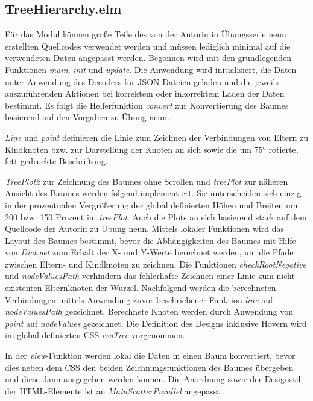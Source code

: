 \documentclass[usegeometry=true]{scrartcl}
\begin{document}
\subsection{TreeHierarchy.elm}
Für das Modul können große Teile des von der Autorin in Übungsserie neun erstellten Quellcodes verwendet werden und müssen lediglich minimal auf die verwendeten Daten angepasst werden. 
Begonnen wird mit den grundlegenden Funktionen \textit{main}, \textit{init} und \textit{update}. 
Die Anwendung wird initialisiert, die Daten unter Anwendung des Decoders für JSON-Dateien geladen und die jeweils auszuführenden Aktionen bei korrektem oder inkorrektem Laden der Daten bestimmt. 
Es folgt die Helferfunktion \textit{convert} zur Konvertierung des Baumes basierend auf den Vorgaben zu Übung neun.

\textit{Line} und \textit{point} definieren die Linie zum Zeichnen der Verbindungen von Eltern zu Kindknoten bzw. zur Darstellung der Knoten an sich sowie die um 75° rotierte, fett gedruckte Beschriftung. 

\textit{TreePlot2} zur Zeichnung des Baumes ohne Scrollen und \textit{treePlot} zur näheren Ansicht des Baumes werden folgend implementiert. 
Sie unterscheiden sich einzig in der prozentualen Vergrößerung der global definierten Höhen und Breiten um 200 bzw. 150 Prozent im \textit{treePlot}.
Auch die Plots an sich basierend stark auf dem Quellcode der Autorin zu Übung neun. 
Mittels lokaler Funktionen wird das Layout des Baumes bestimmt, bevor die Abhängigkeiten des Baumes mit Hilfe von \textit{Dict.get} zum Erhalt der X- und Y-Werte berechnet werden, um die Pfade zwischen Eltern- und Kindknoten zu zeichnen. 
Die Funktionen \textit{checkRootNegative} und \textit{nodeValuesPath} verhindern das fehlerhafte Zeichnen einer Linie zum nicht existenten Elternknoten der Wurzel.
Nachfolgend werden die berechneten Verbindungen mittels Anwendung zuvor beschriebener Funktion \textit{line} auf \textit{nodeValuesPath} gezeichnet.
Berechnete Knoten werden durch Anwendung von \textit{point} auf \textit{nodeValues} gezeichnet. 
Die Definition des Designs inklusive Hovern wird im global definierten CSS \textit{cssTree} vorgenommen. 

In der \textit{view}-Funktion werden lokal die Daten in einen Baum konvertiert, bevor dies neben dem CSS den beiden Zeichnungsfunktionen des Baumes übergeben und diese dann ausgegeben werden können.
Die Anordnung sowie der Designstil der HTML-Elemente ist an \textit{MainScatterParallel} angepasst. 
\end{document}
